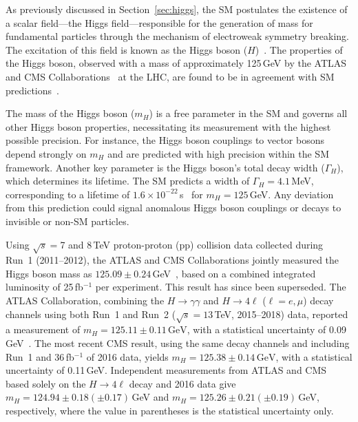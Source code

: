 As previously discussed in Section~\ref{sec:higgs}, the SM postulates the existence of a scalar field---the Higgs field---responsible for the generation of mass for fundamental particles through the mechanism of electroweak symmetry breaking. The excitation of this field is known as the Higgs boson ($H$)~\cite{StandardModel67_1, Englert:1964et, Higgs:1964ia, Higgs:1964pj, Guralnik:1964eu, StandardModel67_2, StandardModel67_3}. The properties of the Higgs boson, observed with a mass of approximately 125\,GeV by the ATLAS and CMS Collaborations~\cite{Aad:2012tfa, Chatrchyan:2012xdj, Chatrchyan:2013lba} at the LHC, are found to be in agreement with SM predictions~\cite{ATLASnature, CMSnature}. 

The mass of the Higgs boson ($m_H$) is a free parameter in the SM and governs all other Higgs boson properties, necessitating its measurement with the highest possible precision. For instance, the Higgs boson couplings to vector bosons depend strongly on $m_H$ and are predicted with high precision within the SM framework. Another key parameter is the Higgs boson's total decay width ($\Gamma_H$), which determines its lifetime. The SM predicts a width of $\Gamma_H = 4.1$\,MeV, corresponding to a lifetime of $1.6 \times 10^{-22}$\,s~\cite{deFlorian:2016spz} for $m_H = 125$\,GeV. Any deviation from this prediction could signal anomalous Higgs boson couplings or decays to invisible or non-SM particles.

Using $\sqrt{s} = $7 and 8\,TeV proton-proton (pp) collision data collected during Run~1 (2011–2012), the ATLAS and CMS Collaborations jointly measured the Higgs boson mass as $125.09 \pm 0.24$\,GeV~\cite{Aad:2015zhl}, based on a combined integrated luminosity of 25\,fb$^{-1}$ per experiment. This result has since been superseded. The ATLAS Collaboration, combining the $H \to \gamma\gamma$ and $H \to 4\ell$ ($\ell = e, \mu$) decay channels using both Run~1 and Run~2 ($\sqrt{s} = 13$\,TeV, 2015–2018) data, reported a measurement of $m_H = 125.11 \pm 0.11\,\mathrm{GeV}$, with a statistical uncertainty of 0.09\,GeV~\cite{ATLAS_mass}. The most recent CMS result, using the same decay channels and including Run~1 and 36\,fb$^{-1}$ of 2016 data, yields $m_H = 125.38 \pm 0.14\,\mathrm{GeV}$, with a statistical uncertainty of 0.11\,GeV. Independent measurements from ATLAS and CMS based solely on the $H \to 4\ell$ decay and 2016 data give $m_H = 124.94 \pm 0.18 (\pm 0.17)$\,GeV and $m_H = 125.26 \pm 0.21 (\pm 0.19)$\,GeV, respectively, where the value in parentheses is the statistical uncertainty only.

